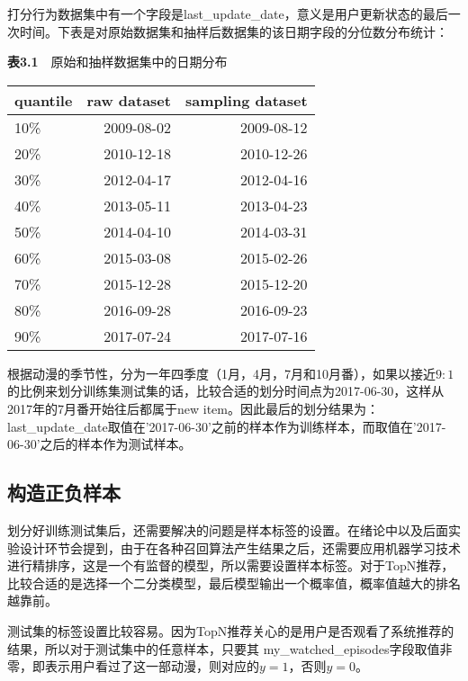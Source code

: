 \documentclass{article}
\begin{document}
	打分行为数据集中有一个字段是last\_update\_date，意义是用户更新状态的最后一次时间。下表是对原始数据集和抽样后数据集的该日期字段的分位数分布统计：	
	\begin{table}[htbp]
	  \centering
	  \textbf{表3.1}~~原始和抽样数据集中的日期分布
	    \begin{tabular}{lrr}
	    \toprule
	    quantile & raw dataset & sampling dataset \\
	    \midrule
	    10\% & 2009-08-02 & 2009-08-12 \\
	    20\% & 2010-12-18 & 2010-12-26 \\
	    30\% & 2012-04-17 & 2012-04-16 \\
	    40\% & 2013-05-11 & 2013-04-23 \\
	    50\% & 2014-04-10 & 2014-03-31 \\
	    60\% & 2015-03-08 & 2015-02-26 \\
	    70\% & 2015-12-28 & 2015-12-20 \\
	    80\% & 2016-09-28 & 2016-09-23 \\
	    90\% & 2017-07-24 & 2017-07-16 \\
	    \bottomrule
	    \end{tabular}%
	  \label{tab:addlabel}%
	\end{table}%
	根据动漫的季节性，分为一年四季度（1月，4月，7月和10月番），如果以接近$9:1$的比例来划分训练集测试集的话，比较合适的划分时间点为2017-06-30，这样从2017年的7月番开始往后都属于new item。因此最后的划分结果为：last\_update\_date取值在'2017-06-30'之前的样本作为训练样本，而取值在'2017-06-30'之后的样本作为测试样本。

	\subsection{构造正负样本}
	划分好训练测试集后，还需要解决的问题是样本标签的设置。在绪论中以及后面实验设计环节会提到，由于在各种召回算法产生结果之后，还需要应用机器学习技术进行精排序，这是一个有监督的模型，所以需要设置样本标签。对于TopN推荐，比较合适的是选择一个二分类模型，最后模型输出一个概率值，概率值越大的排名越靠前。

	测试集的标签设置比较容易。因为TopN推荐关心的是用户是否观看了系统推荐的结果，所以对于测试集中的任意样本，只要其
	my\_watched\_episodes字段取值非零，即表示用户看过了这一部动漫，则对应的$y=1$，否则$y=0$。
\end{document}
